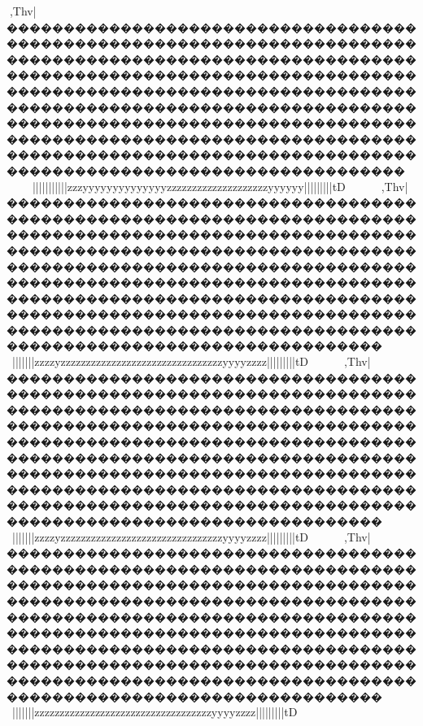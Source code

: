 {{{{{{{{{{{{{{{{{{{{{{{{{{{{{{{{{{{{{{{{{{{{{{{{{{{{{{{{{{{{{{{{{{{{{{{{{{{{{{{{{{{{{{{{{{{{{{{{{{{{{{{{{{{{{{{{{{{{{{{{{{{{{{{{{{{{{{{{{{{{{{{{{{{{{{{{{{{{{{{{{{{{{{{{{{{{{{{{{{{{{{{{{{{{{{{{{{{{{{{{{{{{{{{{{{{{{{{{{{{{{{{{{{{{{{{{{{{{{{{{{{{{{{{{{{{{{{{{{{{{{{{{{{{{{{{{{{{{{{{{{{{{{{{{{{{{{{{{{{{{{{{{{{{{{{{{{{{{{{{{{{{{{{{{{{{{{{{{{{{{{{{{{{{{{{{{{{{{{{{{{{{{{{{{{{{{{{{{{{{{{{{{{{{{{{{{{{{{{{{{{{{{{{{{{{{{{{{{{{{{{{{{{{{{{{{{{{{{{{{{{{{{{{{{{{{{{{{{{{{{{{{{{{{{{{{{{{{{{{{{{{{{{{{{{{{{{{{{{{{{{{{{{{{{{{{{{{{{{{{{{{{{{{{{{{{{{{{{{{{{{{{{{{{{{{{{{{{{{{{{{{{{{{{{{{{{{{{{{{{{{{{{{{{{{{{{{{{{{{{{{{{{{{{{{{{{{{{{{{{{{{{{{{{{{{{{{{{{{{{{{{{{{{{{{{{{{{{{{{{{{{{{{{{{{{{{{{{{{{{{{{{{{{,Thv|�����������������������������������������������������������������������������������������������������������������������������������������������������������������������������������������������������������������������������������������������������������������������������������������������������������������������������������������������������������������������~~~~}||{|||}}}}}||}||||{{{zzzyyyyyyyyyyyyyyzzzzzzzzzzzzzzzzzzzzyyyyyy{{{{{{{{{{{{{|||||||||}}}}}}}}}tD
,Thv|���������������������������������������������������������������������������������������������������������������������������������������������������������������������������������������������������������������������������������������������������������������������������������������������������������������������������������������������������������������������~~~}}|}}}}}}}}||}||||{{{zzzzyzzzzzzzzzzzzzzzzzzzzzzzzzzzzzzzzyyyyzzzz{{{{{{{{{{{|||||||||}}}}}}}}}tD
,Thv|���������������������������������������������������������������������������������������������������������������������������������������������������������������������������������������������������������������������������������������������������������������������������������������������������������������������������������������������������������������������~~~}}|}}}}}}}}||}||||{{{zzzzyzzzzzzzzzzzzzzzzzzzzzzzzzzzzzzzzyyyyzzzz{{{{{{{{{{{|||||||||}}}}}}}}}tD
,Thv|���������������������������������������������������������������������������������������������������������������������������������������������������������������������������������������������������������������������������������������������������������������������������������������������������������������������������������������������������������������������~~~}}|}}}}}}}}||}||||{{{{zzz{zzzzzzzzzzzzzzzzzzzzzzzzzzzzzzzzyyyyzzzz{{{{{{{{{{{|||||||||}}}}}}}}}tD
}}}}}}}}}}}}}}}}}}}}}}}}}}}}}}}}}}}}}}}}}}}}}}}}}}}}}}}}}}}}}}}}}}}}}}}}}}}}}}}}}}}}}}}}}}}}}}}}}}}}}}}}}}}}}}}}}}}}}}}}}}}}}}}}}}}}}}}}}}}}}}}}}}}}}}}}}}}}}}}}}}}}}}}}}}}}}}}}}}}}}}}}}}}}}}}}}}}}}}}}}}}}}}}}}}}}}}}}}}}}}}}}}}}}}}}}}}}}}}}}}}}}}}}}}}}}}}}}}}}}}}}}}}}}}}}}}}}}}}}}}}}}}}}}}}}}}}}}}}}}}}}}}}}}}}}}}}}}}}}}}}}}}}}}}}}}}}}}}}}}}}}}}}}}}}}}}}}}}}}}}}}}}}}}}}}}}}}}}}}}}}}}}}}}}}}}}}}}}}}}}}}}}}}}}}}}}}}}}}}}}}}}}}}}}}}}}}}}}}}}}}}}}}}}}}}}}}}}}}}}}}}}}}}}}}}}}}}}}}}}}}}}}}}}}}}}}}}}}}}}}}}}}}}}}}}}}}}}}}}}}}}}}}}}}}}}}}}}}}}}}}}}}}}}}}}}}}}}}}}}}}}}}}}}}}}}}}}}}}}}}}}}}}}}}}}}}}}}}}}}}}}}}}}}}}}}}}}}}}}}}}}}}}}}}}}}}}}}}}}}}}}}}}}}}}}}}}}}}}}}}}}}}}}}}}}
